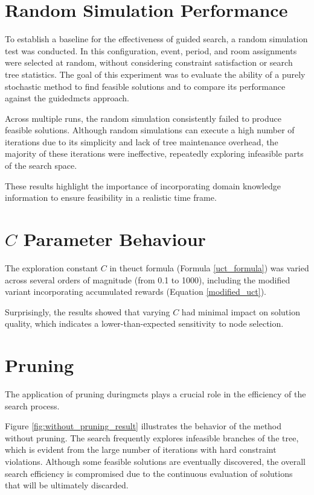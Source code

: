 \section{Random Simulation Performance}

To establish a baseline for the effectiveness of guided search, a random simulation test was conducted.  In this configuration, event, period, and room assignments were selected at random, without considering constraint satisfaction or search tree statistics. The goal of this experiment was to evaluate the ability of a purely stochastic method to find feasible solutions and to compare its performance against the guided\ac{mcts} approach. 

Across multiple runs, the random simulation consistently failed to produce feasible solutions. Although random simulations can execute a high number of iterations due to its simplicity and lack of tree maintenance overhead, the majority of these iterations were ineffective, repeatedly exploring infeasible parts of the search space. 

These results highlight the importance of incorporating domain knowledge information to ensure feasibility in a realistic time frame.

\section{\(C\) Parameter Behaviour}

The exploration constant \(C\) in the\ac{uct} formula (Formula \ref{uct_formula}) was varied across several orders of magnitude (from 0.1 to 1000), including the modified variant incorporating accumulated rewards (Equation \ref{modified_uct}). 

Surprisingly, the results showed that varying \(C\) had minimal impact on solution quality, which indicates a lower-than-expected sensitivity to node selection.

\section{Pruning}

The application of pruning during\ac{mcts} plays a crucial role in the efficiency of the search process.

Figure \ref{fig:without_pruning_result} illustrates the behavior of the method without pruning. The search frequently explores infeasible branches of the tree, which is evident from the large number of iterations with hard constraint violations. Although some feasible solutions are eventually discovered, the overall search efficiency is compromised due to the continuous evaluation of solutions that will be ultimately discarded.

